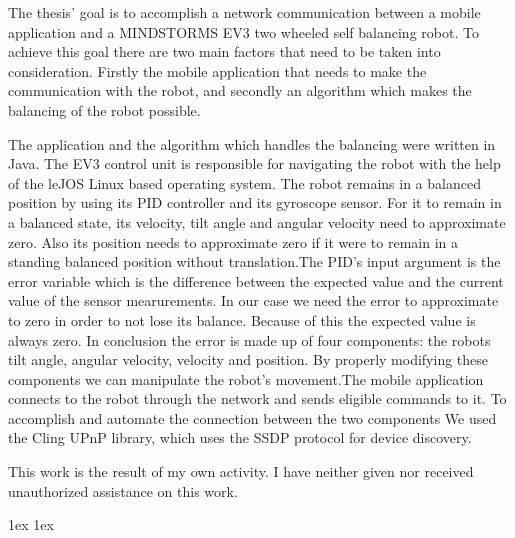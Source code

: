 \documentclass[final]{ubb_dolgozat}
\author{
Márton Zete-Örs
}
\begin{document}
\begin{abstractEN}
	
The thesis’ goal is to accomplish a network communication between a mobile application and a MINDSTORMS EV3 two wheeled self balancing robot. To achieve this goal there are two main factors that need to be taken into consideration. Firstly the mobile application that needs to make the communication with the robot, and secondly an algorithm which makes the balancing of the robot possible.

The application and the algorithm which handles the balancing were written in Java. The EV3 control unit is responsible for navigating the robot with the help of the leJOS Linux based operating system. The robot remains in a balanced position by using its PID controller and its gyroscope sensor. For it to remain in a balanced state, its velocity, tilt angle and angular velocity need to approximate zero. Also its position needs to approximate zero if it were to remain in a standing balanced position without translation.The PID’s input argument is the error variable which is the difference between the expected value and the current value of the sensor mearurements. In our case we need the error to approximate to zero in order to not lose its balance. Because of this the expected value is always zero. In conclusion the error is made up of four components: the robots tilt angle, angular velocity, velocity and position. By properly modifying these components we can manipulate the robot’s movement.The mobile application connects to the robot through the network and sends eligible commands to it. To accomplish and automate the connection between the two components We used the Cling UPnP library, which uses the SSDP protocol for device discovery.

This work is the result of my own activity. I have neither given nor received unauthorized assistance on this work.

\end{abstractEN}

\maketitle

{ \baselineskip 1ex
  \parskip 1ex
  \tableofcontents
}






\appendix

{ 
	\renewcommand{\baselinestretch}{1.4}\normalsize %
	\setlength{\itemsep}{-2.4mm}
	\setlength{\bibspacing}{0.67\baselineskip}
	
	
}
\end{document}
